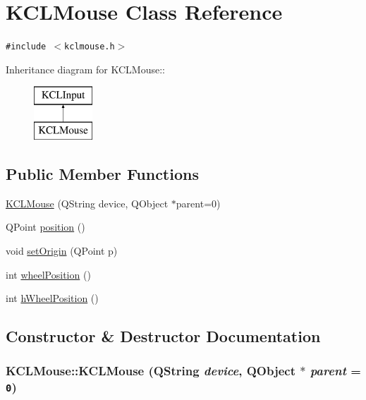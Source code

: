 \hypertarget{class_k_c_l_mouse}{
\section{KCLMouse Class Reference}
\label{class_k_c_l_mouse}
}
{\tt \#include $<$kclmouse.h$>$}

Inheritance diagram for KCLMouse::\begin{figure}[H]
\begin{center}
\leavevmode
\includegraphics[height=2cm]{class_k_c_l_mouse}
\end{center}
\end{figure}
\subsection*{Public Member Functions}
\begin{CompactItemize}
\item 
\hyperlink{class_k_c_l_mouse_b06e2fabbfd2459d9c335f3dc498f53b}{KCLMouse} (QString device, QObject $\ast$parent=0)
\item 
QPoint \hyperlink{class_k_c_l_mouse_0385a723fb0ec739f8943627764a53fb}{position} ()
\item 
void \hyperlink{class_k_c_l_mouse_248e212988997339bb762b9dcc815c96}{setOrigin} (QPoint p)
\item 
int \hyperlink{class_k_c_l_mouse_a913b0b518584db62a341ad75ee49119}{wheelPosition} ()
\item 
int \hyperlink{class_k_c_l_mouse_75f221554270e5bcffdf6b671a62f01a}{hWheelPosition} ()
\end{CompactItemize}


\subsection{Constructor \& Destructor Documentation}
\hypertarget{class_k_c_l_mouse_b06e2fabbfd2459d9c335f3dc498f53b}{
\subsubsection[{KCLMouse}]{\setlength{\rightskip}{0pt plus 5cm}KCLMouse::KCLMouse (QString {\em device}, \/  QObject $\ast$ {\em parent} = {\tt 0})}}
\label{class_k_c_l_mouse_b06e2fabbfd2459d9c335f3dc498f53b}




